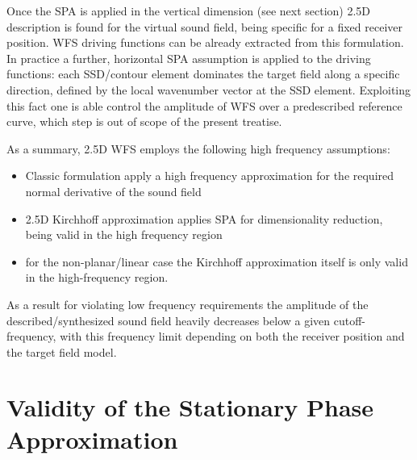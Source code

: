 \documentclass[11pt]{article}
\begin{document}
Once the SPA is applied in the vertical dimension (see next section) 2.5D description is found for the virtual sound field, being specific for a fixed receiver position.
WFS driving functions can be already extracted from this formulation.
In practice a further, horizontal SPA assumption is applied to the driving functions: each SSD/contour element dominates the target field along a specific direction, defined by the local wavenumber vector at the SSD element. 
Exploiting this fact one is able control the amplitude of WFS over a predescribed reference curve, which step is out of scope of the present treatise.

As a summary, 2.5D WFS employs the following high frequency assumptions:
\begin{itemize}
    \item Classic formulation apply a high frequency approximation for the required normal derivative of the sound field
    \item 2.5D Kirchhoff approximation applies SPA for dimensionality reduction, being valid in the high frequency region
    \item for the non-planar/linear case the Kirchhoff approximation itself is only valid in the high-frequency region.
\end{itemize}
As a result for violating low frequency requirements the amplitude of the described/synthesized sound field heavily decreases below a given cutoff-frequency, with this frequency limit depending on both the receiver position and the target field model. 
        
\section{Validity of the Stationary Phase Approximation}
\end{document}
